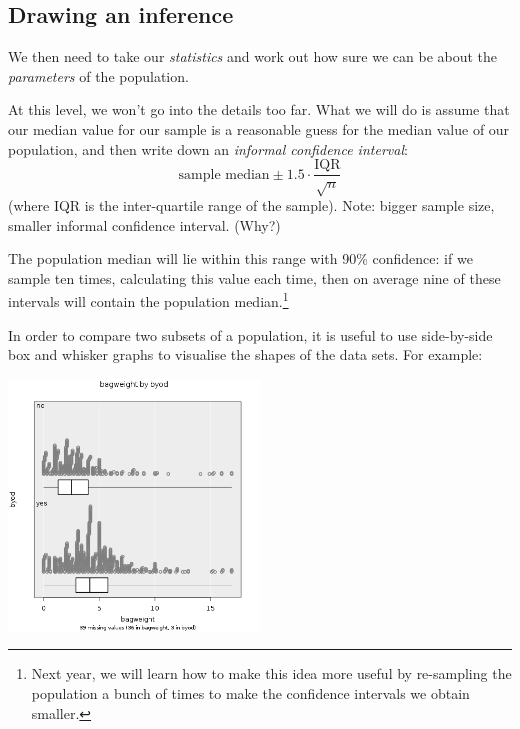 \subsection*{Drawing an inference}
We then need to take our \emph{statistics} and work out how sure we can be about the
\emph{parameters} of the population.

At this level, we won't go into the details too far. What we will do is assume that our
median value for our sample is a reasonable guess for the median value of our population,
and then write down an \emph{informal confidence interval}:
\begin{displaymath}
  \text{sample median} \pm 1.5 \cdot \frac{\text{IQR}}{\sqrt{n}}
\end{displaymath}
(where IQR is the inter-quartile range of the sample). Note: bigger sample size,
smaller informal confidence interval. (Why?)

The population median will lie within this range with 90\% confidence: if
we sample ten times, calculating this value each time, then on average nine of
these intervals will contain the population median.\footnote{Next year, we will
learn how to make this idea more useful by re-sampling the population a bunch of
times to make the confidence intervals we obtain smaller.}

In order to compare two subsets of a population, it is useful to use side-by-side
box and whisker graphs to visualise the shapes of the data sets. For example:
\begin{center}
  \includegraphics[width=0.5\textwidth]{stats-byod}
\end{center}


\clearpage
